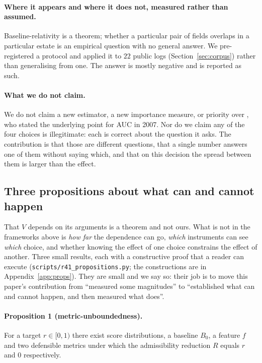\documentclass[preprint,12pt]{elsarticle}
\begin{document}
\paragraph{Where it appears and where it does not, measured rather than
assumed.}
Baseline-relativity is a theorem; whether a particular pair of fields overlaps
in a particular estate is an empirical question with no general answer. We
pre-registered a protocol and applied it to $22$ public logs
(Section~\ref{sec:corpus}) rather than generalising from one. The answer is
mostly negative and is reported as such.

\paragraph{What we do not claim.}
We do not claim a new estimator, a new importance measure, or priority over
\citet{cook2007roc}, who stated the underlying point for AUC in 2007. Nor do
we claim any of the four choices is illegitimate: each is correct about the
question it asks. The contribution is that those are different questions,
that a single number answers one of them without saying which, and that on
this decision the spread between them is larger than the effect.

\subsection{Three propositions about what can and cannot happen}
\label{sec:props}

That $V$ depends on its arguments is a theorem and not ours. What is not in
the frameworks above is \emph{how far} the dependence can go, \emph{which}
instruments can see \emph{which} choice, and whether knowing the effect of one
choice constrains the effect of another. Three small results, each with a
constructive proof that a reader can execute
(\texttt{scripts/r41\_propositions.py}; the constructions are in
Appendix~\ref{app:props}). They are small and we say so: their job is to move
this paper's contribution from ``measured some magnitudes'' to ``established
what can and cannot happen, and then measured what does''.

\paragraph{Proposition 1 (metric-unboundedness).} For a target
$r \in [0,1)$ there exist score distributions, a baseline $B_0$, a feature $f$
and two defensible metrics under which the admissibility reduction $R$ equals
$r$ and $0$ respectively.
\end{document}
